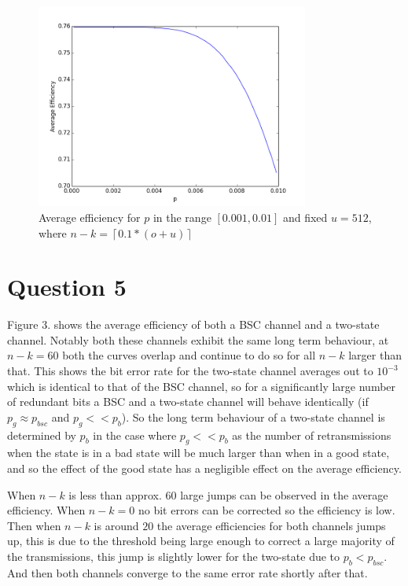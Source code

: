 \documentclass{article}
\begin{document}
\begin{figure}[H]
    \centering
    \includegraphics[width=0.8\textwidth]{q4.png}
    \caption{Average efficiency for  $p$ in the range $[0.001, 0.01]$ and fixed $u = 512$, where $n-k = \left \lceil{0.1 * (o + u)}\right \rceil$}
    \label{fig:awesome_image}
\end{figure}



\section*{Question 5}
Figure 3. shows the average efficiency of both a BSC channel and a two-state channel.
Notably both these channels exhibit the same long term behaviour, at  $n-k = 60$ both the
curves overlap and continue to do so for all $n-k$ larger than that. This shows the bit error
rate for the two-state channel averages out to $10^{-3}$ which is identical to that of the BSC channel,
so for a significantly large number of redundant bits a BSC and a two-state channel will behave identically
(if $p_g \approx p_{bsc}$ and $p_g<< p_b$). So the long term behaviour of a two-state channel is determined by $p_b$ in the case where $p_g<< p_b$ as the number of retransmissions when the state is in a bad state will be
much larger than when in a good state, and so the effect of the good state has a negligible effect on the average
efficiency.

When $n-k$ is less than approx. $60$ large jumps can be observed in the average efficiency. When $n-k = 0$ no
bit errors can be corrected so the efficiency is low. Then when $n-k$ is around $20$ the average efficiencies for both channels jumps up, this is due to the threshold being large enough to correct a large majority of the transmissions, this jump is slightly lower for the two-state due to $p_b < p_{bsc}$. And then both channels converge to the same error rate shortly after that.
\end{document}
